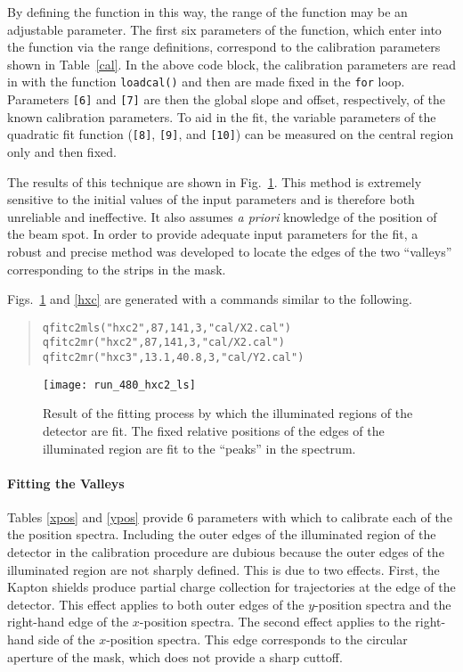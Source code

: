 By defining the function in this way, the range of the function may be an adjustable parameter.  The first six parameters of the function, which enter into the function via the range definitions, correspond to the calibration parameters shown in Table~\ref{cal}.  In the above code block, the calibration parameters are read in with the function \texttt{loadcal()} and then are made fixed in the \texttt{for} loop.  Parameters \texttt{[6]} and \texttt{[7]} are then the global slope and offset, respectively, of the known calibration parameters.  To aid in the fit, the variable parameters of the quadratic fit function (\texttt{[8]}, \texttt{[9]}, and \texttt{[10]}) can be measured on the central region only and then fixed.

The results of this technique are shown in Fig.~\ref{hxc_ls}.  This method is extremely sensitive to the initial values of the input parameters and is therefore both unreliable and ineffective. It also assumes \textit{a priori} knowledge of the position of the beam spot. In order to provide adequate input parameters for the fit, a robust and precise method was developed to locate the edges of the two ``valleys'' corresponding to the strips in the mask.

Figs.~\ref{hxc_ls} and \ref{hxc} are generated with a commands similar to the following.
\vsetroot
\begin{quote}
\begin{Verbatim}[firstnumber=0]
qfitc2mls("hxc2",87,141,3,"cal/X2.cal")
qfitc2mr("hxc2",87,141,3,"cal/X2.cal")
qfitc2mr("hxc3",13.1,40.8,3,"cal/Y2.cal")
\end{Verbatim}
\end{quote}
\vsetnone

\begin{figure}
\centering
\texttt{[image: run\_480\_hxc2\_ls]}
\caption{Result of the fitting process by which the illuminated regions of the detector are fit.  The fixed relative positions of the edges of the illuminated region are fit to the ``peaks'' in the spectrum.}
\label{hxc_ls}
\end{figure}

\paragraph{Fitting the Valleys}
Tables \ref{xpos} and \ref{ypos} provide 6 parameters with which to calibrate each of the the position spectra.  Including the outer edges of the illuminated region of the detector in the calibration procedure are dubious because the outer edges of the illuminated region are not sharply defined.  This is due to two effects.  First, the Kapton shields produce partial charge collection for trajectories at the edge of the detector.  This effect applies to both outer edges of the $y$-position spectra and the right-hand edge of the $x$-position spectra.  The second effect applies to the right-hand side of the $x$-position spectra.  This edge corresponds to the circular aperture of the mask, which does not provide a sharp cuttoff.

